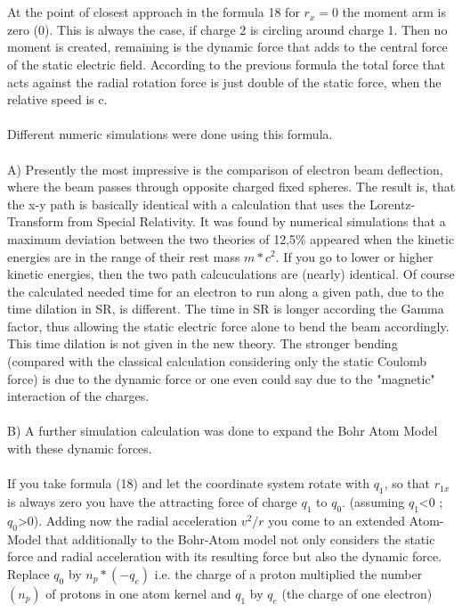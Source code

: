 \documentclass[10pt,titlepage]{article}
\begin{document}
\\
\\
At the point of closest approach in the formula 18 for $r_x = 0$ the moment arm is zero (0). 
This is always the case, if charge 2 is circling around charge 1. Then no moment is created, remaining is the dynamic force that adds to the central force of the static electric field.
According to the previous formula the total force that acts against the radial rotation force is just double of the static force, when the relative speed is c.
\\
\\
Different numeric simulations were done using this formula.        					
\\
\\
A) Presently the most impressive is the comparison of electron beam deflection, where the beam passes through opposite charged fixed spheres.
The result is, that the x-y path is basically identical with a calculation that uses the Lorentz-Transform from Special Relativity.
It was found by numerical simulations that a maximum deviation between the two theories of 12,5\% appeared when the kinetic energies are in the range of their rest mass $m*c^2$. If you go to lower or higher kinetic energies, then the two path calcuculations are (nearly) identical. Of course the calculated needed time for an electron to run along a given path, due to the time dilation in SR, is different. The time in SR is longer according the Gamma factor, thus allowing the static electric force alone to bend the beam accordingly. This time dilation is not given in the new theory. The stronger bending (compared with the classical calculation considering only the static Coulomb force) is due to the dynamic force or one even could say due to the "magnetic" interaction of the charges.
\\
\\
B) A further simulation calculation was done to expand the Bohr Atom Model with these dynamic forces.
\\
\\
If you take formula (18) and let the coordinate system rotate with $q_1$, so that $r_{1x}$ is always zero you have the attracting force of charge $q_1$ to $q_0$. (assuming  $q_1$<0 ; $q_0$>0).
Adding now the radial acceleration $v^2/r$ you come to an extended Atom-Model that additionally to the Bohr-Atom model not only considers the static force and radial acceleration with its resulting force but also the dynamic force. Replace $q_0$ by $n_p*(-q_e)$ i.e. the charge of a proton multiplied the number $(n_p)$ of protons in one atom kernel and $q_1$ by $q_e$ (the charge of one electron)
\end{document}
